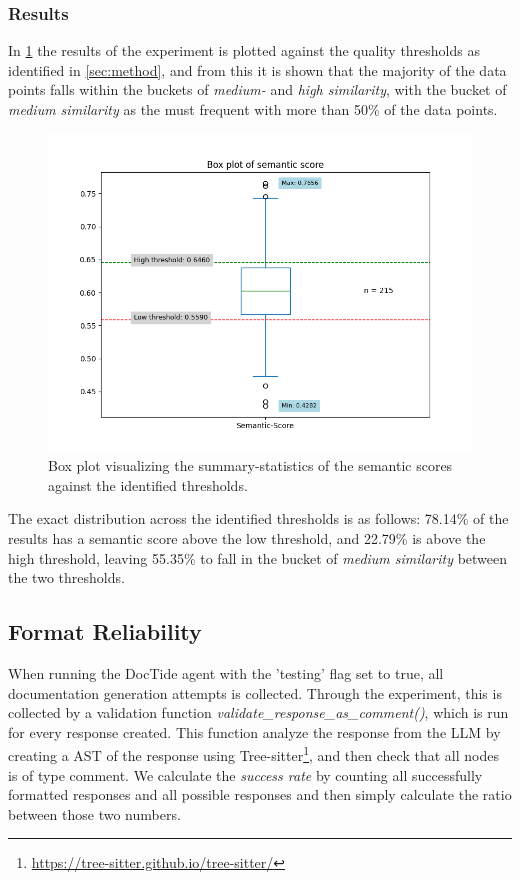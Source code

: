 \subsubsection{Results}
In \cref{fig:sem_box} the results of the experiment is plotted against the quality thresholds as identified in \cref{sec:method}, and from this it is shown that the majority of the data points falls within the buckets of \textit{medium-} and \textit{high similarity}, with the bucket of \textit{medium similarity} as the must frequent with more than 50\% of the data points.

\label{sec:sem_results}
\begin{figure}[H]
\centering
\includegraphics[width=0.7\linewidth]{Figures/semantic_score_box_plot.png}
\caption{Box plot visualizing the summary-statistics of the semantic scores against the identified thresholds.}
\label{fig:sem_box}
\end{figure}

\noindent
The exact distribution across the identified thresholds is as follows: 78.14\% of the results has a semantic score above the low threshold, and 22.79\% is above the high threshold, leaving 55.35\% to fall in the bucket of \textit{medium similarity} between the two thresholds.

\subsection{Format Reliability}
When running the DocTide agent with the 'testing' flag set to true, all documentation generation attempts is collected.
Through the experiment, this is collected by a validation function \textit{validate\_response\_as\_comment()}, which is run for every response created. This function analyze the response from the LLM by creating a AST of the response using Tree-sitter\footnote{\url{https://tree-sitter.github.io/tree-sitter/}}, and then check that all nodes is of type comment.
We calculate the \textit{success rate} by counting all successfully formatted responses and all possible responses and then simply calculate the ratio between those two numbers.

